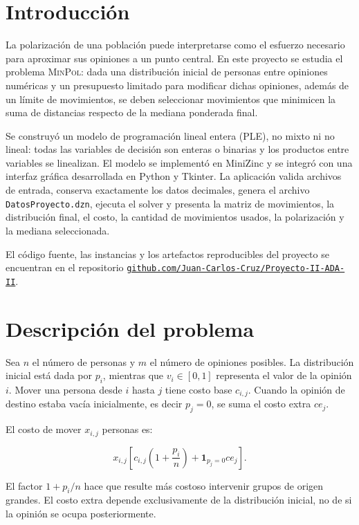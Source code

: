 \documentclass[11pt,letterpaper]{article}
\newcommand{\MinPol}{{\normalfont\scshape MinPol}}
\begin{document}
\tableofcontents
\newpage

\section{Introducción}

La polarización de una población puede interpretarse como el esfuerzo
necesario para aproximar sus opiniones a un punto central. En este proyecto
se estudia el problema \MinPol{}: dada una distribución inicial de personas
entre opiniones numéricas y un presupuesto limitado para modificar dichas
opiniones, además de un límite de movimientos, se deben seleccionar
movimientos que minimicen la suma de distancias respecto de la mediana
ponderada final.

Se construyó un modelo de programación lineal entera (PLE), no mixto ni
no lineal: todas las variables de decisión son enteras o binarias y los
productos entre variables se linealizan. El modelo se implementó en MiniZinc
y se integró con una interfaz gráfica desarrollada en Python y Tkinter. La
aplicación valida archivos de entrada, conserva exactamente los datos
decimales, genera el archivo \texttt{DatosProyecto.dzn}, ejecuta el solver y
presenta la matriz de movimientos, la distribución final, el costo, la
cantidad de movimientos usados, la polarización y la mediana seleccionada.

El código fuente, las instancias y los artefactos reproducibles del proyecto
se encuentran en el repositorio
\href{https://github.com/Juan-Carlos-Cruz/Proyecto-II-ADA-II}
{\texttt{github.com/Juan-Carlos-Cruz/Proyecto-II-ADA-II}}.

\section{Descripción del problema}

Sea \(n\) el número de personas y \(m\) el número de opiniones posibles. La
distribución inicial está dada por \(p_i\), mientras que \(v_i\in[0,1]\)
representa el valor de la opinión \(i\). Mover una persona desde \(i\) hasta
\(j\) tiene costo base \(c_{i,j}\). Cuando la opinión de destino estaba vacía
inicialmente, es decir \(p_j=0\), se suma el costo extra \(ce_j\).

El costo de mover \(x_{i,j}\) personas es:

\[
x_{i,j}\left[
c_{i,j}\left(1+\frac{p_i}{n}\right)
+\mathbf{1}_{p_j=0}ce_j
\right].
\]

El factor \(1+p_i/n\) hace que resulte más costoso intervenir grupos de
origen grandes. El costo extra depende exclusivamente de la distribución
inicial, no de si la opinión se ocupa posteriormente.
\end{document}
